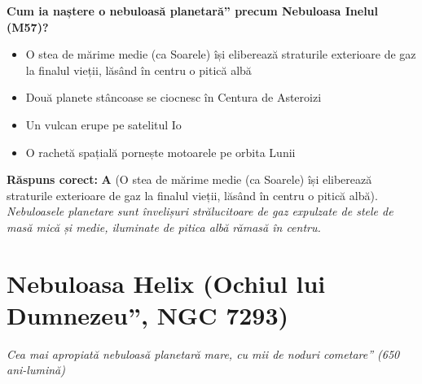\vspace{6pt}
\begin{tcolorbox}[orbitarquiz, title={\textbf{Întrebare de verificare \#69: Nebuloasa Inelul (M57)}}]
\textbf{Cum ia naștere o \quotedblbase{}nebuloasă planetară\textquotedblright{} precum Nebuloasa Inelul (M57)?}
\begin{itemize}[leftmargin=2.2em, itemsep=2pt, topsep=4pt]
  \item[$\square$ \textbf{A.}] O stea de mărime medie (ca Soarele) își eliberează straturile exterioare de gaz la finalul vieții, lăsând în centru o pitică albă
  \item[$\square$ \textbf{B.}] Două planete stâncoase se ciocnesc în Centura de Asteroizi
  \item[$\square$ \textbf{C.}] Un vulcan erupe pe satelitul Io
  \item[$\square$ \textbf{D.}] O rachetă spațială pornește motoarele pe orbita Lunii
\end{itemize}
\vspace{2pt}
{\footnotesize\color{orbitarMuted}\textbf{Răspuns corect:} \textbf{A} (O stea de mărime medie (ca Soarele) își eliberează straturile exterioare de gaz la finalul vieții, lăsând în centru o pitică albă). \emph{Nebuloasele planetare sunt învelișuri strălucitoare de gaz expulzate de stele de masă mică și medie, iluminate de pitica albă rămasă în centru.}}
\end{tcolorbox}
\clearpage


\section{Nebuloasa Helix (\quotedblbase{}Ochiul lui Dumnezeu\textquotedblright{}, NGC 7293)}
\label{sec:body-helix_nebula}
\vspace{-4pt}
{\large\itshape\color{orbitarAccent} Cea mai apropiată nebuloasă planetară mare, cu mii de \quotedblbase{}noduri cometare\textquotedblright{} (650 ani-lumină)}\\[4pt]



